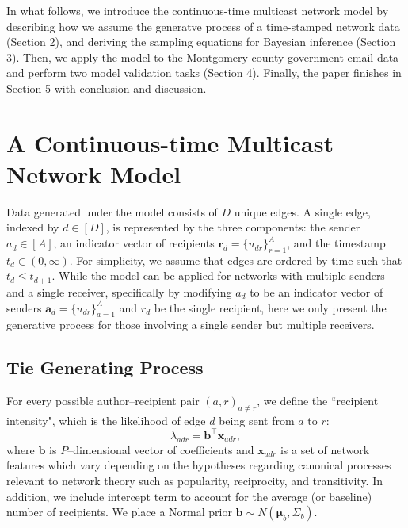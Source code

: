 \documentclass[12pt]{article}
\begin{document}
In what follows, we introduce the continuous-time multicast network model by describing how we assume the generatve process of a time-stamped network data (Section 2), and deriving the sampling equations for Bayesian inference (Section 3). Then, we apply the model to the Montgomery county government email data and perform two model validation tasks (Section 4). Finally, the paper finishes in Section 5 with conclusion and discussion.

\section{A Continuous-time Multicast Network Model}\label{sec:generative process}
Data generated under the model consists of $D$ unique edges. A single edge, indexed by $d \in [D]$, is represented by the three components: the sender $a_d \in [A]$, an indicator vector of recipients $\boldsymbol{r}_d = \{u_{dr} \}_{r=1}^{A}$, and the timestamp $t_d \in (0, \infty)$. For simplicity, we assume that edges are ordered by time such that $t_d \leq t_{d+1}$. While the model can be applied for networks with multiple senders and a single receiver, specifically by modifying $a_d$ to be an indicator vector of senders $\boldsymbol{a}_d = \{u_{dr} \}_{a=1}^{A}$ and $r_d$ be the single recipient, here we only present the generative process for those involving a single sender but multiple receivers.
\subsection{Tie Generating Process}\label{subsec: Tie}
For every possible author--recipient pair $(a,r)_{a \neq r}$, we define the ``recipient intensity", which is the likelihood of edge $d$ being sent from $a$ to $r$:
\begin{equation}
\lambda_{adr} = {\boldsymbol{b}}^{\top}\boldsymbol{x}_{adr},
\end{equation}
where $\boldsymbol{b}$ is $P$--dimensional vector of coefficients and $\boldsymbol{x}_{adr}$ is a set of network features which vary depending on the hypotheses regarding canonical processes relevant to network theory such as popularity, reciprocity, and transitivity. In addition, we include intercept term to account for the average (or baseline) number of recipients. We place a Normal prior $\boldsymbol{b} \sim N(\boldsymbol{\mu}_b, \Sigma_b)$.
\end{document}
